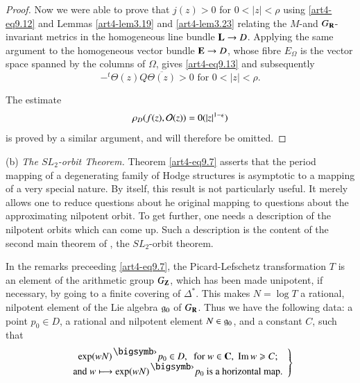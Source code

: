 \begin{proof}
Now we were able to prove that $j(z) > 0$ for $0 < |z| < \rho$ using \eqref{art4-eq9.12} and Lemmas \ref{art4-lem3.19} and \ref{art4-lem3.23} relating the $M$-and $G_{\mathbf{R}}$-invariant metrics in the homogeneous line bundle $\mathbf{L} \to D$. Applying the same argument to the homogeneous vector bundle $\mathbf{E} \to D$, whose fibre $E_\Omega$ is the vector space spanned by the columns of $\Omega$, gives \eqref{art4-eq9.13} and subsequently
$$
-^t \Theta (z) Q \overline{\Theta (z)} > 0 \text{ for } 0 < |z| < \rho.
$$

The estimate
$$
\rho_D (f (z), \mathcal{O}(z))  = 0 (|z|^{1-\epsilon})
$$
is proved by a similar argument, and will therefore be omitted.
\end{proof}

\noindent
(b) \textit{The $SL_2$-orbit Theorem.} Theorem \eqref{art4-eq9.7} asserts that the period mapping of a degenerating family of Hodge structures is asymptotic to a mapping of a very special nature. By itself, this result is not particularly useful. It merely allows one to reduce questions about he original mapping to questions about the approximating nilpotent orbit. To get further, one needs a description of the nilpotent orbits which can come up. Such a description is the content of the second main theorem of \cite{art4-key41}, the $SL_2$-orbit theorem.

In the remarks preceeding \eqref{art4-eq9.7}, the Picard-Lefschetz transformation $T$ is an element of the arithmetic group $G_{\mathbf{Z}}$, which has been made unipotent, if necessary, by going to a finite covering of $\Delta^\ast$. This makes $N = \log T$ a rational, nilpotent element of the Lie algebra $\mathfrak{g}_0$ of $G_{\mathbf{R}}$. Thus we have the following data: a point $p_0 \in D$, a rational and nilpotent element $N \in\mathfrak{g}_0$, and a constant  $C$, such that
\begin{equation}
\left.
\begin{array}{c}
\exp (w N)^\bigdot p_0 \in D, \; \text{ for } w \in \bC, \; \Iim w \geqslant C;\\
\text{and } w\longmapsto \exp (wN)^\bigdot p_0  \text{ is a horizontal map.}
\end{array}
\right\}
\label{art4-eq9.17}
\end{equation}

